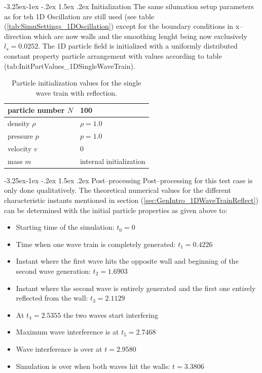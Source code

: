 \documentclass{report}
\makeatletter
\renewcommand\paragraph{\@startsection{paragraph}{4}{\z@}%
  {-3.25ex\@plus -1ex \@minus -.2ex}%
  {1.5ex \@plus .2ex}%
  {\normalfont\normalsize\bfseries}}
\makeatother
\begin{document}
\paragraph{Initialization}
The same silumation setup parameters as for teh 1D Oscillation are still used (see table (\ref{tab:SimuSettings_1DOscillation}) except for the boundary conditions in x--direction which are now walls and the smoothing lenght being now exclusively $l_s=0.0252$.
The 1D particle field is initialized with a uniformly distributed constant property particle arrangement with values according to table (tab:InitPartValues\_1DSingleWaveTrain). 

\begin{table}[h] %
\label{tab:InitPartValues_1DSingleWaveTrain}
\centering

\begin{tabular}[c]{|l|p{5cm}|} %
\hline
\hline
particle number $N$ &  100\\
\hline
density $\rho$ &  $\rho=1.0$\\
\hline
pressure $p$ &  $p=1.0$\\
\hline
velocity $v$ & 0\\
\hline
mass $m$ & internal initialization\\
\hline
\hline
\end{tabular}
\caption[]{Particle initialization values for the single wave train with reflection.}

\end{table}

\paragraph{Post--processing}
Post--processing for this test case is only done qualitatively. The theoretical numerical values for the different characteristic instants mentioned in section (\ref{sec:GenIntro_1DWaveTrainReflect}) can be determined with the initial particle properties as given above to:
\begin{itemize}
 \item Starting time of the simulation: $t_0=0$
\item Time when one wave train is completely generated: $t_1=0.4226$
\item Instant where the first wave hits the opposite wall and beginning of the second wave generation: $t_2=1.6903$
\item Instant where the second wave is entirely generated and the first one entirely reflected from the wall: $t_3=2.1129$
\item At $t_4=2.5355$ the two waves start interfering
\item Maximum wave interference is at $t_5=2.7468$
\item Wave interference is over at $t=2.9580$
\item Simulation is over when both waves hit the walls: $t=3.3806$
\end{itemize}
\end{document}
